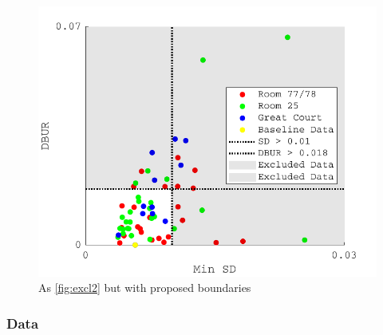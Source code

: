 \begin{figure}[hbtp] 
\includegraphics[max width=\textwidth]{figs/tablet/excl3.pdf} 
\caption{As \ref{fig:excl2} but with proposed boundaries}
\label{fig:excl3}
\end{figure}

\subsubsection{Data}


